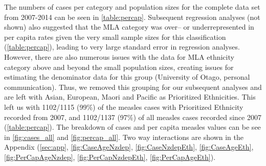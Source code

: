 \documentclass{article}
\begin{document}
The numbers of cases per category and population sizes for the complete data set from 2007-2014 can be seen in \autoref{table:percap}. Subsequent regression analyses (not shown) also suggested that the MLA category was over-- or underrepresented in per capita rates given the very small sample sizes for this classification (\autoref{table:percap}), leading to very large standard error in regression analyses. However, there are also numerous issues with the data for MLA ethnicity category above and beyond the small population sizes, creating issues for estimating the denominator data for this group (University of Otago, personal communication). Thus, we removed this grouping for our subsequent analyses and are left with Asian, European, Maori and Pacific as Prioritized Ethnicities. This left us with 1102/1115 (99\%) of the measles cases with Prioritized Ethnicity recorded from 2007, and 1102/1137 (97\%) of all measles cases recorded since 2007 (\autoref{table:percap}). The breakdown of cases and per capita measles values can be see in \autoref{fig:cases_all} and \autoref{fig:percap_all}. Two way interactions are shown in the Appendix (\autoref{sec:app}, \autoref{fig:CaseAgeNzdep}, \autoref{fig:CaseNzdepEth}, \autoref{fig:CaseAgeEth}, \autoref{fig:PerCapAgeNzdep}, \autoref{fig:PerCapNzdepEth}, \autoref{fig:PerCapAgeEth}).
\end{document}

